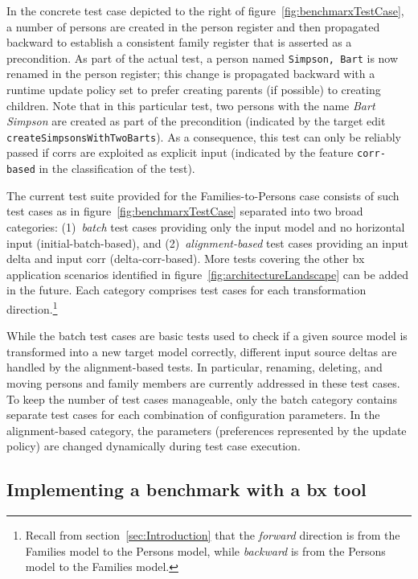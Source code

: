 In the concrete test case depicted to the right of figure~\ref{fig:benchmarxTestCase}, a number of persons are created in the person register and then propagated backward to establish a consistent family register that is asserted as a precondition. 
As part of the actual test, a person named \texttt{Simpson, Bart} is now renamed in the person register; this change is propagated backward with a runtime update policy set to prefer creating parents (if possible) to creating children. 
Note that in this particular test, two persons with the name \emph{Bart Simpson} are created as part of the precondition (indicated by the target edit \texttt{createSimpsonsWithTwoBarts}). 
As a consequence, this test can only be reliably passed if corrs are exploited as explicit input (indicated by the feature \texttt{corr-based} in the classification of the test). 

The current test suite provided for the Families-to-Persons case consists of such test cases as in figure~\ref{fig:benchmarxTestCase} separated into two broad categories: (1)~\emph{batch} test cases providing only the input model and no horizontal input (initial-batch-based), and (2)~\emph{alignment-based} test cases providing an input delta and input corr (delta-corr-based).
More tests covering the other bx application scenarios identified in figure~\ref{fig:architectureLandscape} can be added in the future.
Each category comprises test cases for each transformation direction.\footnote{Recall from section~\ref{sec:Introduction} that the \emph{forward} direction is from the Families model to the Persons model, while \emph{backward} is from the Persons model to the Families model.}

While the batch test cases are basic tests used to check if a given source model is transformed into a new target model correctly, different input source deltas are handled by the alignment-based tests. 
In particular, renaming, deleting, and moving persons and family members are currently addressed in these test cases. 
To keep the number of test cases manageable, only the batch category contains separate test cases for each combination of configuration parameters.
In the alignment-based category, the parameters (preferences represented by the update policy) are changed dynamically during test case execution.



\subsection{Implementing a benchmark with a bx tool}

